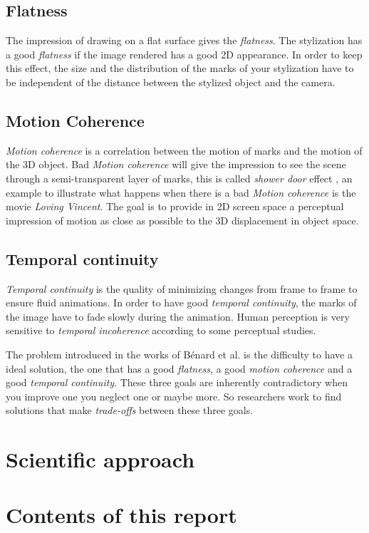 \subsection{Flatness}

The impression of drawing on a flat surface gives the \textit{flatness}. The stylization has a good \textit{flatness} if the image rendered has a good 2D appearance. In order to keep this effect, the size and the distribution of the marks of your stylization have to be independent of the distance between the stylized object and the camera.

\subsection{Motion Coherence}

\textit{Motion coherence} is a correlation between the motion of marks and the motion of the 3D object. Bad \textit{Motion coherence} will give the impression to see the scene through a semi-transparent layer of marks, this is called \textit{shower door} effect \cite{meier_painterly_1996}, an example to illustrate what happens when there is a bad \textit{Motion coherence} is the movie \textit{Loving Vincent}\cite{LovingVincent}. The goal is to provide in 2D screen space a perceptual impression of motion as
close as possible to the 3D displacement in object space.

\subsection{Temporal continuity}

\textit{Temporal continuity} is the quality of minimizing changes from frame to frame to ensure fluid animations. In order to have good \textit{temporal continuity}, the marks of the image have to fade slowly during the animation. Human perception is very sensitive to \textit{temporal incoherence} according to some perceptual studies\cite{percept_studies, Schwarz_2009}. \newline


The problem introduced in the works of Bénard et al.\cite{benard_state---art_2011} is the difficulty to have a ideal solution, the one that has a good \textit{flatness}, a good \textit{motion coherence} and a good \textit{temporal continuity}. These three goals are inherently contradictory when you improve one you neglect one or maybe more. So researchers work to find solutions that make \textit{trade-offs} between these three goals.

\section{Scientific approach}

\section{Contents of this report}
